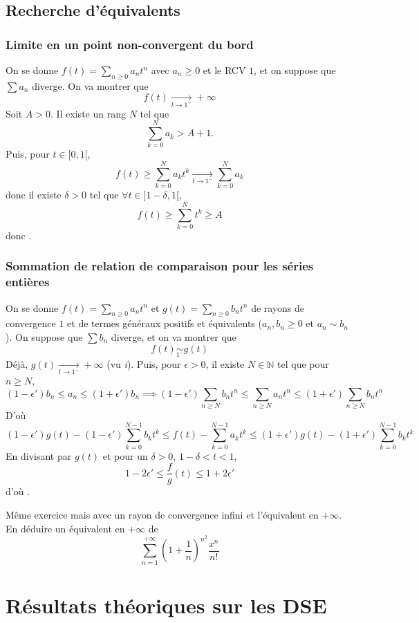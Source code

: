 \subsection{Recherche d'équivalents}

\subsubsection{Limite en un point non-convergent du bord}

On se donne $f(t)=\sum_{n\geq 0}a_nt^n$ avec $a_n\geq 0$ et le RCV $1$, et on suppose que $\sum a_n$ diverge. On va montrer que \[
    f(t)\xrightarrow[t\to1^-]{}+\infty
\]
Soit $A>0$. Il existe un rang $N$ tel que \[
    \sum_{k=0}^Na_k>A+1.
\]
Puis, pour $t\in [0, 1[$, \[
    f(t)\geq \sum_{k=0}^Na_kt^k\xrightarrow[t\to1^-]{}\sum_{k=0}^Na_k
\]
donc il existe $\delta>0$ tel que $\forall t\in ]1-\delta, 1[$, \[
    f(t)\geq \sum_{k=0}^Nt^k\geq A
\]
donc \conc.

\subsubsection{Sommation de relation de comparaison pour les séries entières}

On se donne $f(t)=\sum_{n\geq 0}a_nt^n$ et $g(t)=\sum_{n\geq 0}b_nt^n$ de rayons de convergence $1$ et de termes généraux positifs et équivalents ($a_n,b_n\geq 0$ et $a_n\sim b_n$). On suppose que $\sum b_n$ diverge, et on va montrer que \[
    f(t)\underset{1^-}\sim g(t)
\]
Déjà, $g(t)\xrightarrow[t\to1^-]{}+\infty$ (vu \emph i). Puis, pour $\epsilon>0$, il existe $N\in\mathbb N$ tel que pour $n\geq N$, \[
    (1-\epsilon')b_n\leq a_n\leq (1+\epsilon')b_n \implies (1-\epsilon')\sum_{n\geq N}b_nt^n\leq \sum_{n\geq N}a_nt^n\leq(1+\epsilon')\sum_{n\geq N}b_nt^n
\]
D'où \[
    (1-\epsilon')g(t)-(1-\epsilon')\sum_{k=0}^{N-1}b_kt^k\leq f(t)-\sum_{k=0}^{N-1}a_kt^k\leq (1+\epsilon')g(t)-(1+\epsilon')\sum_{k=0}^{N-1}b_kt^k
\]
En divisant par $g(t)$ et pour un $\delta>0$, $1-\delta<t<1$, \[
    1-2\epsilon'\leq \frac fg(t)\leq 1+2\epsilon'
\]
d'où \conc.

\begin{exo}
    Même exercice mais avec un rayon de convergence infini et l'équivalent en $+\infty$. En déduire un équivalent en $+\infty$ de \[
        \sum_{n=1}^{+\infty} \left( 1+ \frac{1}{n} \right)^{n^2}\frac{x^n}{n!}
    \]
\end{exo}

\section{Résultats théoriques sur les DSE}

